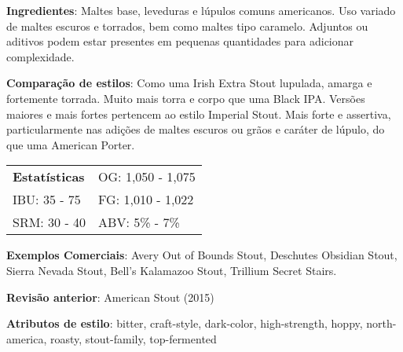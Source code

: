 \textbf{Ingredientes}: Maltes base, leveduras e lúpulos comuns americanos. Uso variado de maltes escuros e torrados, bem como maltes tipo caramelo. Adjuntos ou aditivos podem estar presentes em pequenas quantidades para adicionar complexidade.

\textbf{Comparação de estilos}: Como uma Irish Extra Stout lupulada, amarga e fortemente torrada. Muito mais torra e corpo que uma Black IPA. Versões maiores e mais fortes pertencem ao estilo Imperial Stout. Mais forte e assertiva, particularmente nas adições de maltes escuros ou grãos e caráter de lúpulo, do que uma American Porter.

\begin{tabular}{@{}p{35mm}p{35mm}@{}}
  \textbf{Estatísticas} & OG: 1,050 - 1,075 \\
  IBU: 35 - 75  & FG: 1,010 - 1,022 \\
  SRM: 30 - 40  & ABV: 5\% - 7\%
\end{tabular}

\textbf{Exemplos Comerciais}: Avery Out of Bounds Stout, Deschutes Obsidian Stout, Sierra Nevada Stout, Bell’s Kalamazoo Stout, Trillium Secret Stairs.

\textbf{Revisão anterior}: American Stout (2015)

\textbf{Atributos de estilo}: bitter, craft-style, dark-color, high-strength, hoppy, north-america, roasty, stout-family, top-fermented
